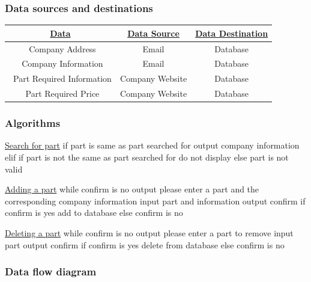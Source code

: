 \subsubsection{Data sources and destinations}
\begin{center}
\begin{tabular}{ |c|c|c| } 
\hline
\bf\underline{Data}                                                                                                      & \bf\underline{Data Source} & \bf\underline{Data Destination}

\\
\hline
\ Company Address & Email & Database\\ 
\hline
\ Company Information & Email & Database\\
\hline
\ Part Required Information & Company Website & Database\\
\hline
\ Part Required Price & Company Website & Database\\
\hline
\end{tabular}
\end{center}
\subsubsection{Algorithms}

\underline{Search for part}
if part is same as part searched for
output company information
elif
if part is not the same as part searched for
do not display
else
part is not valid

\underline{Adding a part}
while confirm is no
output please enter a part and the corresponding company information
input part and information
output confirm
if confirm is yes
add to database
else 
confirm is no

\underline{Deleting a part}
while confirm is no
output please enter a part to remove
input part
output confirm
if confirm is yes
delete from database
else 
confirm is no

\subsubsection{Data flow diagram}

